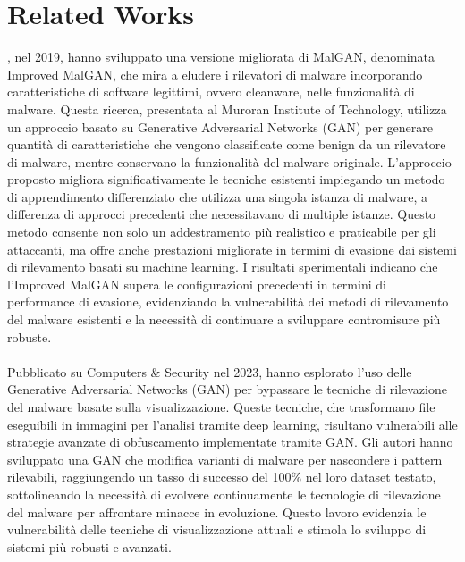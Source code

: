 \chapter{Related Works}
\label{cap:RelatedWorks}
, nel 2019, hanno sviluppato una versione migliorata di MalGAN, denominata Improved MalGAN, che mira a eludere i rilevatori di malware incorporando caratteristiche di software legittimi, ovvero cleanware, nelle funzionalità di malware. Questa ricerca, presentata al Muroran Institute of Technology, utilizza un approccio basato su Generative Adversarial Networks (GAN) per generare quantità di caratteristiche che vengono classificate come benign da un rilevatore di malware, mentre conservano la funzionalità del malware originale. L'approccio proposto migliora significativamente le tecniche esistenti impiegando un metodo di apprendimento differenziato che utilizza una singola istanza di malware, a differenza di approcci precedenti che necessitavano di multiple istanze. Questo metodo consente non solo un addestramento più realistico e praticabile per gli attaccanti, ma offre anche prestazioni migliorate in termini di evasione dai sistemi di rilevamento basati su machine learning. I risultati sperimentali indicano che l'Improved MalGAN supera le configurazioni precedenti in termini di performance di evasione, evidenziando la vulnerabilità dei metodi di rilevamento del malware esistenti e la necessità di continuare a sviluppare contromisure più robuste.\\\\
Pubblicato su Computers \& Security nel 2023,  hanno esplorato l'uso delle Generative Adversarial Networks (GAN) per bypassare le tecniche di rilevazione del malware basate sulla visualizzazione. Queste tecniche, che trasformano file eseguibili in immagini per l'analisi tramite deep learning, risultano vulnerabili alle strategie avanzate di obfuscamento implementate tramite GAN. Gli autori hanno sviluppato una GAN che modifica varianti di malware per nascondere i pattern rilevabili, raggiungendo un tasso di successo del 100\% nel loro dataset testato, sottolineando la necessità di evolvere continuamente le tecnologie di rilevazione del malware per affrontare minacce in evoluzione. Questo lavoro evidenzia le vulnerabilità delle tecniche di visualizzazione attuali e stimola lo sviluppo di sistemi più robusti e avanzati.\\\\
